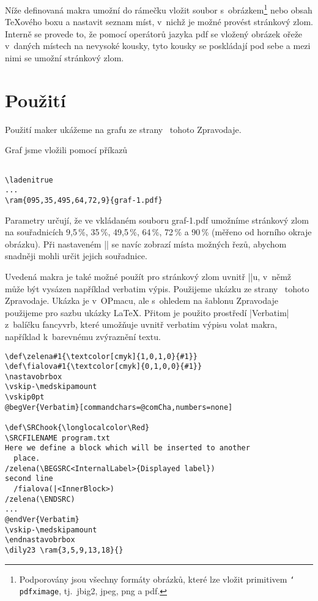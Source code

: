 \documentclass[oldcsbabel]{csbulletin}
\def\p#1{\texttt{\char`\\#1}}
\def\soub#1{{\sf#1}}
\def\mTODO#1{\marginpar{\hbox{\color{red}\hskip-1cm\bf TODO\hskip3cm\bf TODO}}}
\begin{document}
Níže definovaná makra umožní do rámečku vložit soubor s~obrázkem\footnote{Podporovány jsou všechny formáty obrázků, které lze vložit primitivem \p{pdfximage}, tj.~\soub{jbig2}, \soub{jpeg}, \soub{png} a \soub{pdf}.} nebo obsah \TeX ového boxu a nastavit seznam míst, v~nichž je možné provést stránkový zlom. Interně se provede to, že pomocí operátorů jazyka pdf se vložený obrázek ořeže v~daných místech na nevysoké kousky, tyto kousky se poskládají pod sebe a mezi nimi se umožní stránkový zlom.

\JSvvvskip

\section{Použití}

Použití maker ukážeme na grafu ze strany~\mTODO{aktualizovat podle skutečnosti}{\bf??} tohoto Zpravodaje.

\ladenitrue
{}

\noindent
Graf jsme vložili pomocí příkazů
\begin{Verbatim}[numbers=none]

\ladenitrue
...
\ram{095,35,495,64,72,9}{graf-1.pdf}
\end{Verbatim}
\noindent
Parametry určují, že ve vkládaném souboru \soub{graf-1.pdf} umožníme stránkový zlom na souřadnicích 9,5\,\%, 35\,\%, 49,5\,\%, 64\,\%, 72\,\% a 90\,\% (měřeno od horního okraje obrázku). Při nastaveném |\ladenitrue| se navíc zobrazí místa možných řezů, abychom snadněji mohli určit jejich souřadnice.

\def\nastavobrbox{\setbox\obrbox\vbox\bgroup
  \hsize\dimexpr\hsize-2\hodstup\relax}
\def\endnastavobrbox{\egroup}

Uvedená makra je také možné použít pro stránkový zlom uvnitř |\vbox|u, v~němž může být vysázen například verbatim výpis. Použijeme ukázku ze strany~\mTODO{aktualizovat podle skutečnosti}{\bf??} tohoto Zpravodaje. Ukázka je v~OPmacu, ale s~ohledem na šablonu Zpravodaje použijeme pro sazbu ukázky \LaTeX. Přitom je použito prostředí |Verbatim| z~balíčku \soub{fancyvrb}, které umožňuje uvnitř verbatim výpisu volat makra, například k~barevnému zvýraznění textu.

\def\begVer{\char`\\begin}
\def\comCha{/()}
\def\endVer{\char`\\end}
\begin{Verbatim}[commandchars=@QW,numbers=none]
\def\zelena#1{\textcolor[cmyk]{1,0,1,0}{#1}}
\def\fialova#1{\textcolor[cmyk]{0,1,0,0}{#1}}
\nastavobrbox
\vskip-\medskipamount
\vskip0pt
@begVer{Verbatim}[commandchars=@comCha,numbers=none]

\def\SRChook{\longlocalcolor\Red}
\SRCFILENAME program.txt
Here we define a block which will be inserted to another
  place.
/zelena(\BEGSRC<InternalLabel>{Displayed label})
second line
  /fialova(|<InnerBlock>)
/zelena(\ENDSRC)
...
@endVer{Verbatim}
\vskip-\medskipamount
\endnastavobrbox
\dily23 \ram{3,5,9,13,18}{}
\end{Verbatim}
\end{document}
